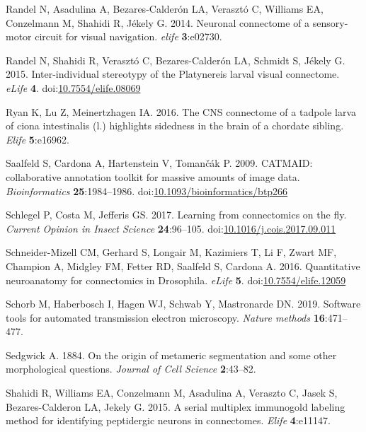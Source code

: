 \documentclass[
  11pt,
]{article}
\newlength{\cslhangindent}
\newenvironment{CSLReferences}[2] %
 {\begin{list}{}{%
  \setlength{\itemindent}{0pt}
  \setlength{\leftmargin}{0pt}
  \setlength{\parsep}{0pt}
  \ifodd #1
   \setlength{\leftmargin}{\cslhangindent}
   \setlength{\itemindent}{-1\cslhangindent}
  \fi
  \setlength{\itemsep}{#2\baselineskip}}}
 {\end{list}}
\begin{document}
\begin{CSLReferences}{1}{0}
Randel N, Asadulina A, Bezares-Calderón LA, Verasztó C, Williams EA,
Conzelmann M, Shahidi R, Jékely G. 2014. Neuronal connectome of a
sensory-motor circuit for visual navigation. \emph{elife}
\textbf{3}:e02730.

Randel N, Shahidi R, Verasztó C, Bezares-Calderón LA, Schmidt S, Jékely
G. 2015. Inter-individual stereotypy of the Platynereis larval visual
connectome. \emph{eLife} \textbf{4}.
doi:\href{https://doi.org/10.7554/elife.08069}{10.7554/elife.08069}

Ryan K, Lu Z, Meinertzhagen IA. 2016. The CNS connectome of a tadpole
larva of ciona intestinalis (l.) highlights sidedness in the brain of a
chordate sibling. \emph{Elife} \textbf{5}:e16962.

Saalfeld S, Cardona A, Hartenstein V, Tomančák P. 2009. CATMAID:
collaborative annotation toolkit for massive amounts of image data.
\emph{Bioinformatics} \textbf{25}:1984--1986.
doi:\href{https://doi.org/10.1093/bioinformatics/btp266}{10.1093/bioinformatics/btp266}

Schlegel P, Costa M, Jefferis GS. 2017. Learning from connectomics on
the fly. \emph{Current Opinion in Insect Science} \textbf{24}:96--105.
doi:\href{https://doi.org/10.1016/j.cois.2017.09.011}{10.1016/j.cois.2017.09.011}

Schneider-Mizell CM, Gerhard S, Longair M, Kazimiers T, Li F, Zwart MF,
Champion A, Midgley FM, Fetter RD, Saalfeld S, Cardona A. 2016.
Quantitative neuroanatomy for connectomics in Drosophila. \emph{eLife}
\textbf{5}.
doi:\href{https://doi.org/10.7554/elife.12059}{10.7554/elife.12059}

Schorb M, Haberbosch I, Hagen WJ, Schwab Y, Mastronarde DN. 2019.
Software tools for automated transmission electron microscopy.
\emph{Nature methods} \textbf{16}:471--477.

Sedgwick A. 1884. On the origin of metameric segmentation and some other
morphological questions. \emph{Journal of Cell Science}
\textbf{2}:43--82.

Shahidi R, Williams EA, Conzelmann M, Asadulina A, Veraszto C, Jasek S,
Bezares-Calderon LA, Jekely G. 2015. A serial multiplex immunogold
labeling method for identifying peptidergic neurons in connectomes.
\emph{Elife} \textbf{4}:e11147.


\end{CSLReferences}
\end{document}
